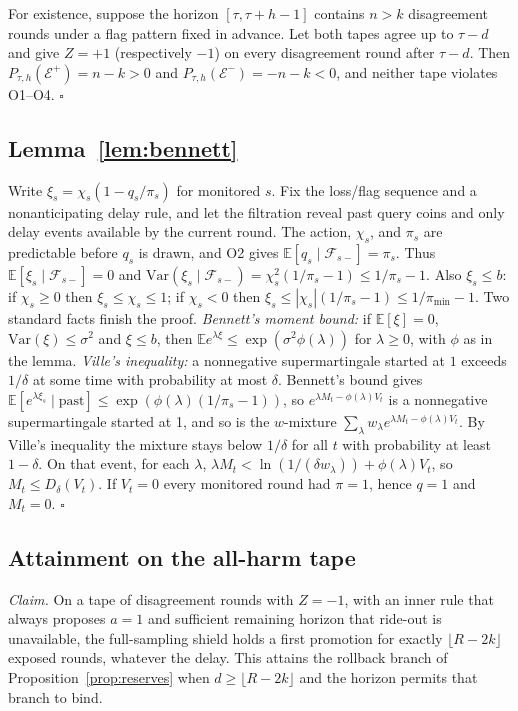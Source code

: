\documentclass[10pt]{article}
\theoremstyle{plain}
\theoremstyle{definition}
\newcommand{\E}{\mathbb{E}}
\begin{document}
For existence, suppose the horizon $[\tau,\tau+h-1]$ contains $n>k$ disagreement rounds under a flag pattern fixed in advance. Let both tapes agree up to $\tau-d$ and give $Z=+1$ (respectively $-1$) on every disagreement round after $\tau-d$. Then $P_{\tau,h}(\mathcal E^+)=n-k>0$ and $P_{\tau,h}(\mathcal E^-)=-n-k<0$, and neither tape violates O1--O4. $\square$

\subsection{Lemma~\ref{lem:bennett}}
Write $\xi_s=\chi_s(1-q_s/\pi_s)$ for monitored $s$. Fix the loss/flag sequence and a nonanticipating delay rule, and let the filtration reveal past query coins and only delay events available by the current round. The action, $\chi_s$, and $\pi_s$ are predictable before $q_s$ is drawn, and O2 gives $\E[q_s\mid\mathcal F_{s-}]=\pi_s$. Thus $\E[\xi_s\mid\mathcal F_{s-}]=0$ and $\mathrm{Var}(\xi_s\mid\mathcal F_{s-})=\chi_s^2(1/\pi_s-1)\le1/\pi_s-1$. Also $\xi_s\le b$: if $\chi_s\ge0$ then $\xi_s\le\chi_s\le1$; if $\chi_s<0$ then $\xi_s\le|\chi_s|(1/\pi_s-1)\le1/\pi_{\min}-1$. Two standard facts finish the proof. \emph{Bennett's moment bound:} if $\E[\xi]=0$, $\mathrm{Var}(\xi)\le\sigma^2$ and $\xi\le b$, then $\E e^{\lambda\xi}\le\exp(\sigma^2\phi(\lambda))$ for $\lambda\ge0$, with $\phi$ as in the lemma. \emph{Ville's inequality:} a nonnegative supermartingale started at $1$ exceeds $1/\delta$ at some time with probability at most $\delta$. Bennett's bound gives $\E[e^{\lambda\xi_s}\mid\text{past}]\le\exp(\phi(\lambda)(1/\pi_s-1))$, so $e^{\lambda M_t-\phi(\lambda)V_t}$ is a nonnegative supermartingale started at 1, and so is the $w$-mixture $\sum_\lambda w_\lambda e^{\lambda M_t-\phi(\lambda)V_t}$. By Ville's inequality the mixture stays below $1/\delta$ for all $t$ with probability at least $1-\delta$. On that event, for each $\lambda$, $\lambda M_t<\ln(1/(\delta w_\lambda))+\phi(\lambda)V_t$, so $M_t\le D_\delta(V_t)$. If $V_t=0$ every monitored round had $\pi=1$, hence $q=1$ and $M_t=0$. $\square$

\subsection{Attainment on the all-harm tape}
\emph{Claim.} On a tape of disagreement rounds with $Z=-1$, with an inner rule that always proposes $a=1$ and sufficient remaining horizon that ride-out is unavailable, the full-sampling shield holds a first promotion for exactly $\lfloor R-2k\rfloor$ exposed rounds, whatever the delay. This attains the rollback branch of Proposition~\ref{prop:reserves} when $d\ge\lfloor R-2k\rfloor$ and the horizon permits that branch to bind.
\end{document}
